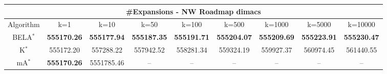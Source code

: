 \begin{tabular}{c|cccccccc}\toprule
\multicolumn{9}{c}{#Expansions - NW Roadmap dimacs}\\ \midrule
Algorithm & k=1 & k=10 & k=50 & k=100 & k=500 & k=1000 & k=5000 & k=10000 \\ \midrule
BELA$^*$ & \textbf{555170.26} & \textbf{555177.94} & \textbf{555187.35} & \textbf{555191.71} & \textbf{555204.07} & \textbf{555209.69} & \textbf{555223.91} & \textbf{555230.47} \\
K$^*$ & 555172.20 & 557288.22 & 557942.52 & 558281.34 & 559324.19 & 559927.37 & 560974.45 & 561440.55 \\
mA$^*$ & \textbf{555170.26} & 5551785.46 & -- & -- & -- & -- & -- & -- \\ \bottomrule 
\end{tabular}
